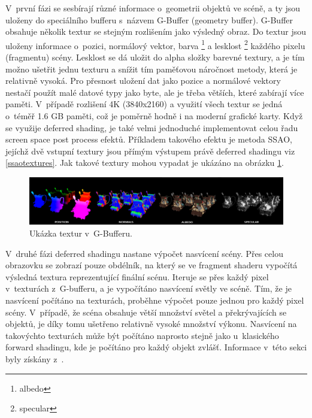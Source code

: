 V~první fázi se sesbírají různé informace o~geometrii objektů ve scéně, a ty jsou uloženy do speciálního bufferu s~názvem G-Buffer (geometry buffer). G-Buffer obsahuje několik textur se stejným rozlišením jako výsledný obraz. Do textur jsou uloženy informace o~pozici, normálový vektor, barva \footnote{albedo} a lesklost \footnote{specular} každého pixelu (fragmentu) scény. Lesklost se dá uložit do alpha složky barevné textury, a je tím možno ušetřit jednu texturu a snížit tím paměťovou náročnost metody, která je relativně vysoká. Pro přesnost uložení dat jako pozice a normálové vektory nestačí použít malé datové typy jako byte, ale je třeba větších, které zabírají více paměti. V~případě rozlišení 4K (3840x2160) a využití všech textur se jedná o~téměř 1.6 GB paměti, což je poměrně hodně i na moderní grafické karty. Když se využije deferred shading, je také velmi jednoduché implementovat celou řadu screen space post process efektů. Příkladem takového efektu je metoda SSAO, jejíchž dvě vstupní textury jsou přímým výstupem právě deferred shadingu viz \ref{ssaotextures}. Jak takové textury mohou vypadat je ukázáno na obrázku \ref{g-buffer-images}. 
\begin{figure}[H]
	\centering
	\includegraphics[width=40em]{images/navrh/deferred_g_buffer.png}
	\caption[caption]{Ukázka textur v~G-Bufferu.\footnotemark} 
	\label{g-buffer-images}
\end{figure}

V~druhé fázi deferred shadingu nastane výpočet nasvícení scény. Přes celou obrazovku se zobrazí pouze obdélník, na který se ve fragment shaderu vypočítá výsledná textura reprezentující finální scénu. Iteruje se přes každý pixel v~texturách z~G-bufferu, a je vypočítáno nasvícení světly ve scéně. Tím, že je nasvícení počítáno na texturách, proběhne výpočet pouze jednou pro každý pixel scény. V~případě, že scéna obsahuje větší množství světel a překrývajících se objektů, je díky tomu ušetřeno relativně vysoké množství výkonu. Nasvícení na takovýchto texturách může být počítáno naprosto stejně jako u~klasického forward shadingu, kde je počítáno pro každý objekt zvlášť. Informace v~této sekci byly získány z~\cite{learnogl}.

